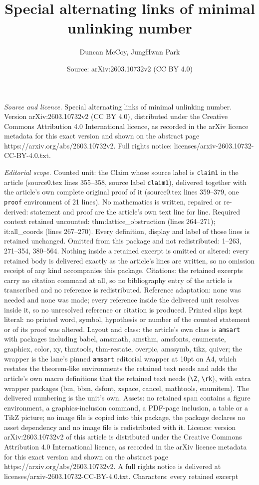 \documentclass[10pt,a4paper]{amsart}
\title[Special alternating links of minimal unlinking number]{Special alternating links of minimal unlinking number}
\author{Duncan McCoy, JungHwan Park}
\date{Source: arXiv:2603.10732v2 (CC BY 4.0)}
\begin{document}
\maketitle

\noindent\emph{Source and licence.} Special alternating links of minimal unlinking number. Version arXiv:2603.10732v2 (CC BY 4.0), distributed under the Creative Commons Attribution 4.0 International licence, as recorded in the arXiv licence metadata for this exact version and shown on the abstract page https://arxiv.org/abs/2603.10732v2. Full rights notice: licenses/arxiv-2603.10732-CC-BY-4.0.txt.\par\smallskip

\noindent\textit{Editorial scope.} Counted unit: the Claim whose source label is \texttt{claim1} in the article (source0.tex lines 355--358, source label \texttt{claim1}), delivered together with the article's own complete original proof of it (source0.tex lines 359--379, one \texttt{proof} environment of 21 lines). No mathematics is written, repaired or re-derived: statement and proof are the article's own text line for line. Required context retained uncounted: thm:lattice\_obstruction (lines 264--271); it:all\_coords (lines 267--270). Every definition, display and label of those lines is retained unchanged. Omitted from this package and not redistributed: 1--263, 271--354, 380--564. Nothing inside a retained excerpt is omitted or altered: every retained body is delivered exactly as the article's lines are written, so no omission receipt of any kind accompanies this package. Citations: the retained excerpts carry no citation command at all, so no bibliography entry of the article is transcribed and no reference is redistributed. Reference adaptation: none was needed and none was made; every reference inside the delivered unit resolves inside it, so no unresolved reference or citation is produced. Printed slips kept literal: no printed word, symbol, hypothesis or number of the counted statement or of its proof was altered. Layout and class: the article's own class is \texttt{amsart} with packages including babel, amsmath, amsthm, amsfonts, enumerate, graphicx, color, xy, thmtools, thm-restate, overpic, amssymb, tikz, quiver; the wrapper is the lane's pinned \texttt{amsart} editorial wrapper at 10pt on A4, which restates the theorem-like environments the retained text needs and adds the article's own macro definitions that the retained text needs (\texttt{\textbackslash Z}, \texttt{\textbackslash rk}), with extra wrapper packages (bm, bbm, dsfont, xspace, cancel, mathtools, enumitem). The delivered numbering is the unit's own. Assets: no retained span contains a figure environment, a graphics-inclusion command, a PDF-page inclusion, a table or a TikZ picture; no image file is copied into this package, the package declares no asset dependency and no image file is redistributed with it. Licence: version arXiv:2603.10732v2 of this article is distributed under the Creative Commons Attribution 4.0 International licence, as recorded in the arXiv licence metadata for this exact version and shown on the abstract page https://arxiv.org/abs/2603.10732v2. A full rights notice is delivered at licenses/arxiv-2603.10732-CC-BY-4.0.txt. Characters: every retained excerpt 
\end{document}
